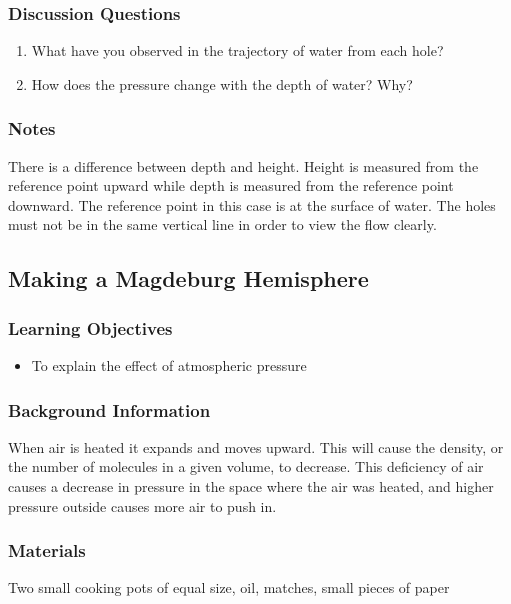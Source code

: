 \subsubsection*{Discussion Questions}
\begin{enumerate}
\item{What have you observed in the trajectory of water from each hole?}
\item{How does the pressure change with the depth of water? Why?}
\end{enumerate}

\subsubsection*{Notes}
There is a difference between depth and height. Height is measured from the reference point upward while depth is measured from the reference point downward. The reference point in this case is at the surface of water. The holes must not be in the same vertical line in order to view the flow clearly. 

\subsection{Making a Magdeburg Hemisphere}

\subsubsection*{Learning Objectives}
\begin{itemize}
\item{To explain the effect of atmospheric pressure} 
\end{itemize}

\subsubsection*{Background Information}
When air is heated it expands and moves upward. This will cause the density, or the number of molecules in a given volume, to decrease. This deficiency of air causes a decrease in pressure in the space where the air was heated, and higher pressure outside causes more air to push in.

\subsubsection*{Materials}
Two small cooking pots of equal size, oil, matches, small pieces of paper

